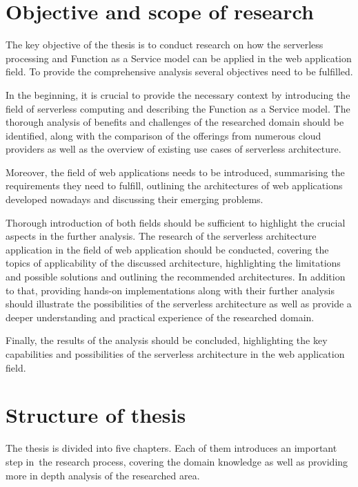 \section{Objective and scope of research}

The key objective of the thesis is to conduct research on how the serverless processing and Function as a Service model can be applied in the web application field.
To provide the comprehensive analysis several objectives need to be fulfilled.

In the beginning, it is crucial to provide the necessary context by introducing the field of serverless computing and describing the Function as a Service model.
The thorough analysis of benefits and challenges of the researched domain should be identified, along with the comparison of the offerings from numerous cloud providers as well as the overview of existing use cases of serverless architecture.

Moreover, the field of web applications needs to be introduced, summarising the requirements they need to fulfill, outlining the architectures of web applications developed nowadays and discussing their emerging problems.

Thorough introduction of both fields should be sufficient to highlight the crucial aspects in the further analysis.
The research of the serverless architecture application in the field of web application should be conducted, covering the topics of applicability of the discussed architecture,
highlighting the limitations and possible solutions and outlining the recommended architectures.
In addition to that, providing hands-on implementations along with their further analysis should illustrate the possibilities of the serverless architecture as well as provide a deeper understanding and practical experience of the researched domain.

Finally, the results of the analysis should be concluded, highlighting the key capabilities and possibilities of the serverless architecture in the web application field.

\section{Structure of thesis}

The thesis is divided into five chapters. Each of them introduces an important step in~the research process, covering the domain knowledge as well as providing more in depth analysis of the researched area.


